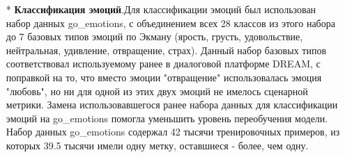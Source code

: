 \begin{itemize}
\item[*]\textbf{Классификация эмоций}.Для классификации эмоций был использован набор данных {go\_emotions}\cite{go_emotions}, с объединением всех 28 классов из этого набора до 7 базовых типов эмоций по Экману (ярость, грусть, удовольствие, нейтральная, удивление, отвращение, страх). Данный набор базовых типов соответствовал используемому ранее в диалоговой платформе DREAM, с поправкой на то, что вместо эмоции "отвращение" использовалась эмоция "любовь", но ни для одной из этих двух эмоций не имелось сценарной метрики. Замена использовавшегося ранее набора данных для классификации эмоций на {go\_emotions} помогла уменьшить уровень переобучения модели.
 Набор данных go\_emotions содержал 42 тысячи тренировочных примеров, из которых 39.5 тысячи имели одну метку, оставшиеся - более, чем одну. 


\end{itemize}
